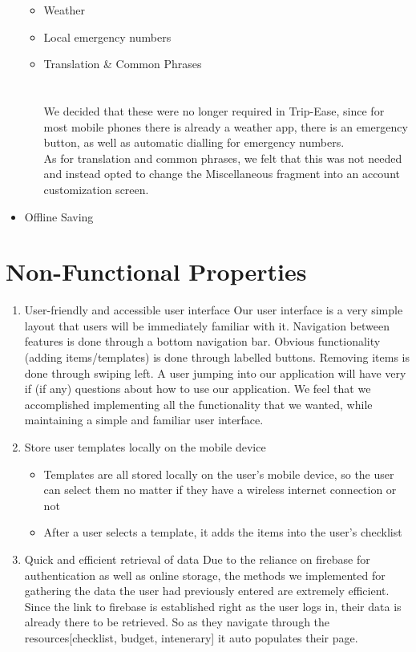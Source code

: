 \documentclass[12pt]{article}
\begin{document}
\begin{itemize}
		\begin{itemize}
			\item Weather
			\item Local emergency numbers
			\item Translation \& Common Phrases
			\\
			\\
			\\
			We decided that these were no longer required in Trip-Ease, since for most mobile phones there is already a weather app, there is an emergency button, as well as automatic dialling for emergency numbers.\\
			As for translation and common phrases, we felt that this was not needed and instead opted to change the Miscellaneous fragment into an account customization screen.
		\end{itemize}

		\item{Offline Saving}

	\end{itemize}

	\section*{Non-Functional Properties}


	\begin{enumerate}
		\item{User-friendly and accessible user interface}
		Our user interface is a very simple layout that users will be immediately familiar with it. Navigation between features is done through a bottom navigation bar.
		Obvious functionality (adding items/templates) is done through labelled buttons. Removing items is done through swiping left.
		A user jumping into our application will have very if (if any) questions about how to use our application.
		We feel that we accomplished implementing all the functionality that we wanted, while maintaining a simple and familiar user interface.

		\item{Store user templates locally on the mobile device}
		\begin{itemize}
			\item Templates are all stored locally on the user's mobile device, so the user can select them no matter if they have a wireless internet connection or not
			\item After a user selects a template, it adds the items into the user's checklist
		\end{itemize}

		\item{Quick and efficient retrieval of data}
		Due to the reliance on firebase for authentication as well as online storage, the methods we implemented for gathering the data the user had previously entered
		are extremely efficient.
		Since the link to firebase is established right as the user logs in, their data is already there to be retrieved.
		So as they navigate through the resources[checklist, budget, intenerary] it auto populates their page.
	\end{enumerate}

	\pagebreak
\end{document}
